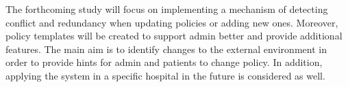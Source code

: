 \documentclass[conference]{IEEEtran}
\begin{document}
The forthcoming study will focus on implementing a mechanism of detecting conflict and redundancy when updating policies or adding new ones. 
Moreover,  policy templates will be created to support admin better and provide additional features. 
The main aim is to identify changes to the external environment in order to provide hints for admin and patients to change policy. 
In addition, applying the system in a specific hospital in the future is considered as well.



\end{document}
